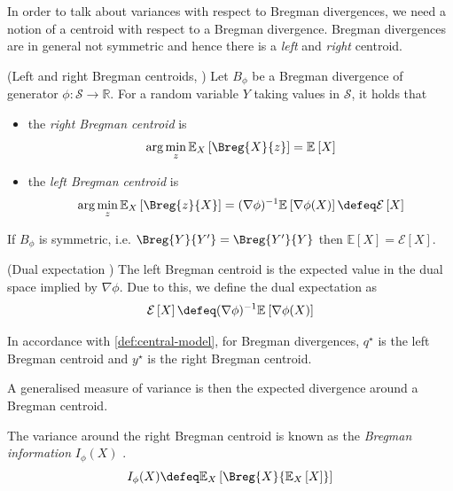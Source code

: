 \documentclass[
	twoside=false, %
]{kaobook}
\begin{document}
In order to talk about variances with respect to Bregman divergences, we need a notion of a centroid with respect to a Bregman divergence. Bregman divergences are in general not symmetric and hence there is a \textit{left} and \textit{right} centroid.

\begin{lemma} (Left and right Bregman centroids, \cite{pfau_GeneralizedBiasVarianceDecomposition_})
  \label{thm:bregman-centroids}
    Let $B_{\phi}$ be a Bregman divergence of generator $\phi: \mathcal{S} \to \mathbb{R}$. For a random variable $Y$ taking values in $\mathcal{S}$, it holds that
\begin{itemize}
    \item the \textit{right Bregman centroid} is $$\arg \min_z \mathbb{E}_{X}\left[ \Breg{X}{z}  \right] = \mathbb{E}_{}\left[ X \right]$$
    \item the \textit{left Bregman centroid} is $$\arg\min_{z}  \mathbb{E}_{X}\left[ \Breg{z}{X}\right] = (\nabla \phi)^{-1} \mathbb{E}_{}\left[ \nabla \phi(X) \right] \defeq \mathcal{E}\left[X\right]$$
\end{itemize}
  If $B_\phi$ is symmetric, i.e. $\Breg{Y}{Y'} = \Breg{Y'}{Y}$ then $\mathbb{E}\left[X\right] = \mathcal{E}\left[X\right]$.
\end{lemma}
\begin{definition} (Dual expectation \cite{pfau_GeneralizedBiasVarianceDecomposition_})
  \label{def:dual-expectation}
  The left Bregman centroid is the expected value in the dual space implied by $\nabla\phi$. Due to this, we define the dual expectation as  
  $$\mathcal{E}\left[X\right] \defeq (\nabla \phi)^{-1}\mathbb{E}_{}\left[ \nabla \phi(X) \right]$$ 
\end{definition}
In accordance with \cref{def:central-model}, for Bregman divergences, $q^\star$ is the left Bregman centroid and $y^\star$ is the right Bregman centroid.


A generalised measure of variance is then the expected divergence around a Bregman centroid.

\begin{definition}
	\label{def:bregman-information}
	The variance around the right Bregman centroid is known as the 
	\textit{Bregman information} 
  $I_{\phi}(X)$
  \cite{banerjee_ClusteringBregmanDivergences_2004}.
$$
I_{\phi}(X) \defeq \mathbb{E}_{X}\left[ \Breg{X}{\mathbb{E}_X\left[ X \right] } \right] 
$$
\end{definition}
\end{document}
